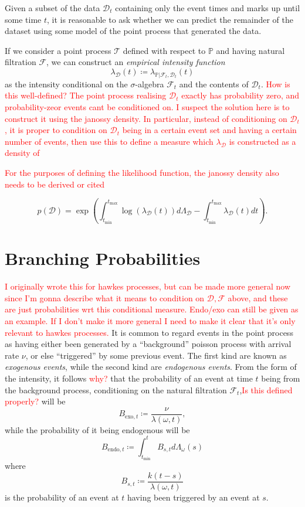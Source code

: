 \documentclass[honours,12pt]{unswthesis}
\numberwithin{equation}{section}
\begin{document}
Given a subset of the data $\mathcal{D}_t$ containing only the event times and marks up until some time $t$, it is reasonable to ask whether we can predict the remainder of the dataset using some model of the point process that generated the data.

If we consider a point process $\mathcal{T}$ defined with respect to $\mathbb{P}$ and having natural filtration $\mathcal{F}$, we can construct an \textit{empirical intensity function}
$$\lambda_\mathcal{D}(t) \coloneq \lambda_{\mathbb{P}\vert\mathcal{F}_t,\mathcal{D}_t}(t)$$
as the intensity conditional on the $\sigma$-algebra $\mathcal{F}_t$ and the contents of $\mathcal{D}_t$. \textcolor{red}{How is this well-defined? The point process realising $\mathcal{D}_t$ exactly has probability zero, and probability-zeor events cant be conditioned on. I suspect the solution here is to construct it using the janossy density. In particular, instead of conditioning on $\mathcal{D}_t$, it is proper to condition on $\mathcal{D}_t$ being in a certain event set and having a certain number of events, then use this to define a measure which $\lambda_\mathcal{D}$ is constructed as a density of}

\textcolor{red}{For the purposes of defining the likelihood function, the janossy density also needs to be derived or cited}

$$p(\mathcal{D}) = \exp\left(\int_{t_\mathrm{min}}^{t_\mathrm{max}}\log(\lambda_\mathcal{D}(t))d\Lambda_\mathcal{D}-\int_{t_\mathrm{min}}^{t_\mathrm{max}}\lambda_\mathcal{D}(t) dt\right).$$

\section{Branching Probabilities}
\textcolor{red}{I originally wrote this for hawkes processes, but can be made more general now since I'm gonna describe what it means to condition on $\mathcal{D},\mathcal{F}$ above, and these are just probabilities wrt this conditional measure. Endo/exo can still be given as an example. If I don't make it more general I need to make it clear that it's only relevant to hawkes processes.}
It is common to regard events in the point process as having either been generated by a ``background'' poisson process with arrival rate $\nu$, or else ``triggered'' by some previous event. The first kind are known as \textit{exogenous events}, while the second kind are \textit{endogenous events}. From the form of the intensity, it follows \textcolor{red}{why?} that the probability of an event at time $t$ being from the background process, conditioning on the natural filtration $\mathcal{F}_t$,\textcolor{red}{Is this defined properly?} will be
$$B_{\mathrm{exo},t}\coloneq \frac{\nu}{\lambda(\omega,t)},$$
while the probability of it being endogenous will be
$$B_{\mathrm{endo},t}\coloneq \int_{t_\mathrm{min}}^t B_{s,t}d\Lambda_\omega(s)$$
where
$$B_{s,t} \coloneq \frac{k(t-s)}{\lambda(\omega,t)}$$
is the probability of an event at $t$ having been triggered by an event at $s$.
\end{document}
